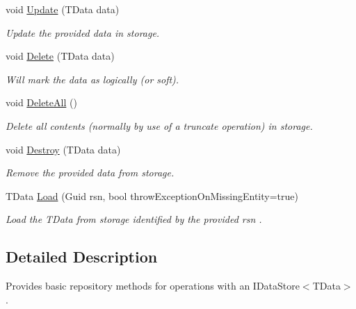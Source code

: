 \begin{DoxyCompactItemize}
void \hyperlink{interfaceCqrs_1_1Repositories_1_1IRepository_af8a0b1cf5eedd7653d2867ab38657d46_af8a0b1cf5eedd7653d2867ab38657d46}{Update} (T\+Data data)
\begin{DoxyCompactList}\small\item\em Update the provided {\itshape data}  in storage. \end{DoxyCompactList}\item 
void \hyperlink{interfaceCqrs_1_1Repositories_1_1IRepository_a71c60de3588a757da2d25350c98374fd_a71c60de3588a757da2d25350c98374fd}{Delete} (T\+Data data)
\begin{DoxyCompactList}\small\item\em Will mark the {\itshape data}  as logically (or soft). \end{DoxyCompactList}\item 
void \hyperlink{interfaceCqrs_1_1Repositories_1_1IRepository_a0da5f756a0fd184dc51a81741f82734a_a0da5f756a0fd184dc51a81741f82734a}{Delete\+All} ()
\begin{DoxyCompactList}\small\item\em Delete all contents (normally by use of a truncate operation) in storage. \end{DoxyCompactList}\item 
void \hyperlink{interfaceCqrs_1_1Repositories_1_1IRepository_a3a7a60be19498813b3822558b88fad66_a3a7a60be19498813b3822558b88fad66}{Destroy} (T\+Data data)
\begin{DoxyCompactList}\small\item\em Remove the provided {\itshape data}  from storage. \end{DoxyCompactList}\item 
T\+Data \hyperlink{interfaceCqrs_1_1Repositories_1_1IRepository_ae545451c48d1e2b5693db73e169e100d_ae545451c48d1e2b5693db73e169e100d}{Load} (Guid rsn, bool throw\+Exception\+On\+Missing\+Entity=true)
\begin{DoxyCompactList}\small\item\em Load the {\itshape T\+Data}  from storage identified by the provided {\itshape rsn} . \end{DoxyCompactList}\end{DoxyCompactItemize}


\subsection{Detailed Description}
Provides basic repository methods for operations with an I\+Data\+Store$<$\+T\+Data$>$. 


